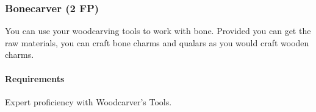 \subsubsection{Bonecarver (2 FP)} \label{feat::bonecarver}
    You can use your woodcarving tools to work with bone.
    Provided you can get the raw materials, you can craft bone charms and qualars as you would craft wooden charms.
    \paragraph{Requirements} Expert proficiency with Woodcarver's Tools.

%
